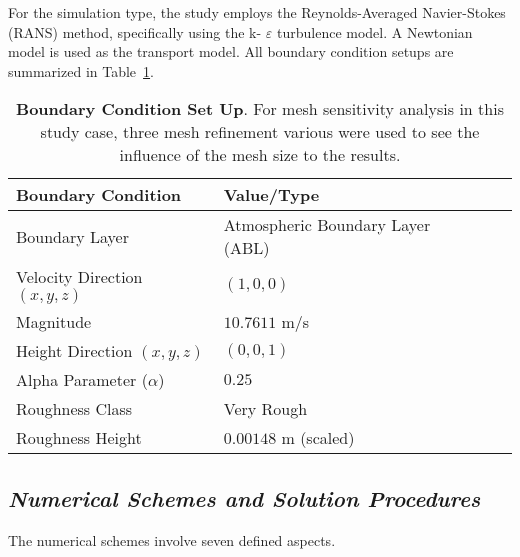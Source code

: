 \documentclass[12pt,a4paper]{cibb}
\begin{document}
For the simulation type, the study employs the Reynolds-Averaged Navier-Stokes (RANS) method, specifically using the k-
$\varepsilon$ turbulence model. A Newtonian model is used as the transport model. All boundary condition setups are summarized in Table~\ref{tab:bcsetup}.


\begin{table}[httb!] \small
\centering
\vspace{5mm}
    \begin{tabularx}{0.7\textwidth}{ l  l  l c }
        \toprule
          \textbf{Boundary Condition} & \textbf{Value/Type}  \\
        \midrule
        Boundary Layer & Atmospheric Boundary Layer (ABL)  \\ 
	Velocity Direction $(x,y,z)$ & $(1, 0, 0)$  \\ 
	Magnitude & $10.7611$ m/s \\ 
        Height Direction $(x,y,z)$ & $(0, 0, 1)$  \\
	Alpha Parameter ($\alpha$) & $0.25$ \\
        Roughness Class & Very Rough \\
        Roughness Height & $0.00148$ m (scaled) \\
        
        \bottomrule
    \end{tabularx}
    \caption{\textbf{Boundary Condition Set Up}.
    For mesh sensitivity analysis in this study case, three mesh refinement various were used to see the influence of the mesh size to the results.\label{tab:bcsetup}}
    \vspace{-5mm}
\end{table}

\subsection{\bf \it Numerical Schemes and Solution Procedures}
The numerical schemes involve seven defined aspects. 
\end{document}
